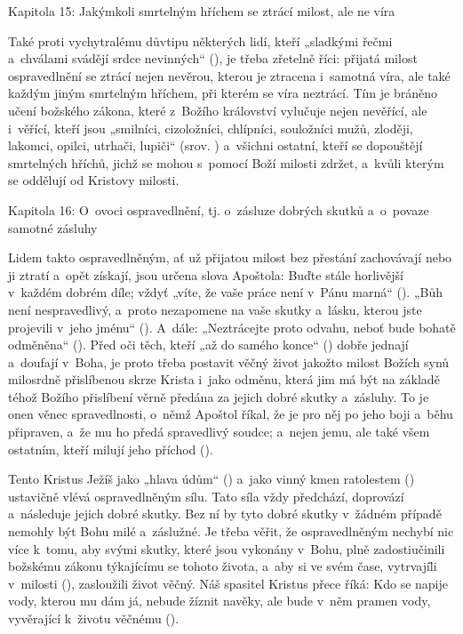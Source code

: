 \chaptitle
Kapitola 15:
Jakýmkoli smrtelným hříchem se ztrácí milost, ale ne víra

Také proti vychytralému důvtipu některých lidí, kteří „sladkými řečmi a~chválami
svádějí srdce nevinných“ (), je třeba zřetelně říci: přijatá milost ospravedlnění
se ztrácí nejen nevěrou, kterou je ztracena i~samotná víra, ale také každým jiným
smrtelným hříchem, při kterém se víra neztrácí. Tím je bráněno učení božského zákona,
které z~Božího království vylučuje nejen nevěřící, ale i~věřící, kteří jsou „smilníci,
cizoložníci, chlípníci, souložníci mužů, zloději, lakomci, opilci, utrhači, lupiči“
(srov. ) a~všichni ostatní, kteří se dopouštějí smrtelných hříchů, jichž
se mohou s~pomocí Boží milosti zdržet, a~kvůli kterým se oddělují od Kristovy milosti.

\chaptitle
Kapitola 16:
O~ovoci ospravedlnění, tj. o~zásluze dobrých skutků a~o~povaze samotné zásluhy

Lidem takto ospravedlněným, ať už přijatou milost bez přestání zachovávají nebo
ji ztratí a~opět získají, jsou určena slova Apoštola: Buďte stále horlivější v~každém
dobrém díle; vždyť „víte, že vaše práce není v~Pánu marná“ (). „Bůh
není nespravedlivý, a~proto nezapomene na vaše skutky a~lásku, kterou jste projevili
v~jeho jménu“ (). A~dále: „Neztrácejte proto odvahu, neboť bude bohatě
odměněna“ (). Před oči těch, kteří „až do samého konce“ () dobře
jednají a~doufají v~Boha, je proto třeba postavit věčný život jakožto milost Božích
synů milosrdně přislíbenou skrze Krista i~jako odměnu, která jim má být na základě
téhož Božího přislíbení věrně předána za jejich dobré skutky a~zásluhy. To je onen
věnec spravedlnosti, o~němž Apoštol říkal, že je pro něj po jeho boji a~běhu připraven,
a~že mu ho předá spravedlivý soudce; a~nejen jemu, ale také všem ostatním, kteří
milují jeho příchod ().

Tento Kristus Ježíš jako „hlava údům“ () a~jako vinný kmen ratolestem () ustavičně vlévá ospravedlněným sílu. Tato síla vždy předchází, doprovází a~následuje
jejich dobré skutky. Bez ní by tyto dobré skutky v~žádném případě nemohly být Bohu
milé a~záslužné. Je třeba věřit, že ospravedlněným nechybí nic více k~tomu, aby svými
skutky, které jsou vykonány v~Bohu, plně zadostiučinili božskému zákonu týkajícímu
se tohoto života, a~aby si ve svém čase, vytrvají\=li v~milosti (), zasloužili
život věčný. Náš spasitel Kristus přece říká: Kdo se napije vody, kterou mu dám já,
nebude žíznit navěky, ale bude v~něm pramen vody, vyvěrající k~životu věčnému ().

